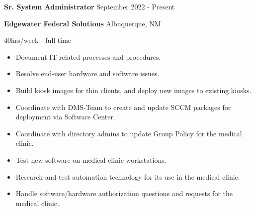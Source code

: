 \documentclass[../main.tex]{subfiles}
\begin{document}
    \textbf{Sr. System Administrator}
    \hfill
    September 2022 - Present
    
    \textbf{Edgewater Federal Solutions}
    \hfill
    Albuquerque, NM
    
    \hfill
    40hrs/week - full time
    \begin{itemize}
        \item Document IT related processes and procedures.
        \item Resolve end-user hardware and software issues.
        \item Build kiosk images for thin clients, and deploy new images to existing kiosks.
        \item Coordinate with DMS-Team to create and update SCCM packages for deployment via Software Center.
        \item Coordinate with directory admins to update Group Policy for the medical clinic.
        \item Test new software on medical clinic workstations.
        \item Research and test automation technology for its use in the medical clinic.
        \item Handle software/hardware authorization questions and requests for the medical clinic.
    \end{itemize}
\end{document}
